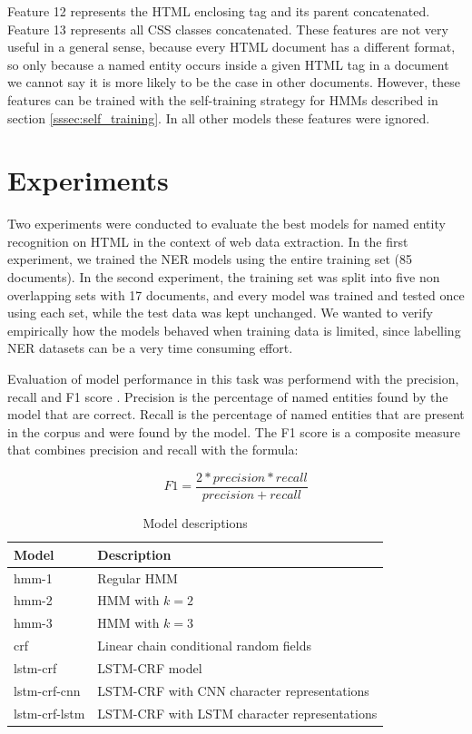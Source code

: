 \documentclass[sigconf]{acmart}
\begin{document}
Feature 12 represents the HTML enclosing tag and its parent concatenated. Feature 13
represents all CSS classes concatenated. These features are not very useful in a general
sense, because every HTML document has a different format, so only because a named entity
occurs inside a given HTML tag in a document we cannot say it is more likely to be the case 
in other documents. However, these features can be trained with the self-training strategy 
for HMMs described in section \ref{sssec:self_training}. In all other models these features 
were ignored.

\section{Experiments}

Two experiments were conducted to evaluate the best models for named entity recognition
on HTML in the context of web data extraction. In the first experiment, we trained the NER models
using the entire training set (85 documents). In the second experiment, the training set was 
split into five non overlapping sets with 17 documents, and every model was trained
and tested once using each set, while the test data was kept unchanged. We wanted to verify empirically 
how the models behaved when training data is limited, since labelling NER datasets can be a
very time consuming effort.

Evaluation of model performance in this task was performend with the precision, recall and 
F1 score \cite{Rijsbergen1979}. Precision is the percentage of named entities found by 
the model that are correct. Recall is the percentage of named entities that are present
in the corpus and were found by the model. The F1 score is a composite measure that combines
precision and recall with the formula:

\begin{equation}
F1 = \frac{2 * precision * recall}{precision + recall}
\end{equation}

\begin{table}[h]
  \small
  \begin{center}
    \begin{tabular}{ ll }
      \toprule
      Model & Description \\
      \midrule
      hmm-1         & Regular HMM \\
      hmm-2         & HMM with $ k=2 $ \\
      hmm-3         & HMM with $ k=3 $ \\
      crf           & Linear chain conditional random fields \\
      lstm-crf      & LSTM-CRF model \cite{Huang2015} \\
      lstm-crf-cnn  & LSTM-CRF with CNN character representations \cite{Ma2016} \\
      lstm-crf-lstm & LSTM-CRF with LSTM character representations \cite{Lample2016} \\
      \bottomrule
    \end{tabular}
  \end{center}
  \caption{Model descriptions}
  \label{tab:models}
\end{table}
\end{document}
